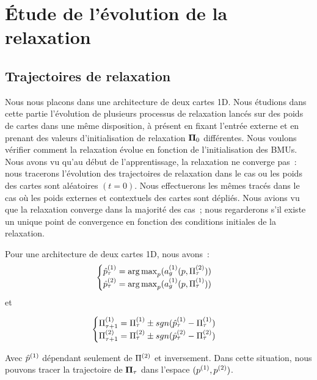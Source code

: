 \documentclass[../main]{subfiles}
\begin{document}
\section{\'Etude de l'évolution de la relaxation}

\subsection{Trajectoires de relaxation\label{sec:pf}}

Nous nous placons dans une architecture de deux cartes 1D.
Nous étudions dans cette partie l'évolution de plusieurs processus de relaxation lancés sur des poids de cartes dans une même disposition, à présent en fixant l'entrée externe et en prenant des valeurs d'initialisation de relaxation $\mathbf{\Pi}_0$ différentes.
Nous voulons vérifier comment la relaxation évolue en fonction de l'initialisation des BMUs.
Nous avons vu qu'au début de l'apprentissage, la relaxation ne converge pas~: nous tracerons l'évolution des trajectoires de relaxation dans le cas ou les poids des cartes sont aléatoires $(t=0)$.
Nous effectuerons les mêmes tracés dans le cas où les poids externes et contextuels des cartes sont dépliés. Nous avions vu que la relaxation converge dans la majorité des cas~; nous regarderons s'il existe un unique point de convergence en fonction des conditions initiales de la relaxation.


Pour une architecture de deux cartes 1D, nous avons~:
\begin{equation*}
	\begin{cases}
	\hat{p}^{({1})}_\tau = \operatorname*{arg\,max}_p(a_g^{({1})}(p, \Pi^{({2})}_\tau))\\
	\hat{p}^{({2})}_\tau = \operatorname*{arg\,max}_p(a_g^{({1})}(p, \Pi^{({1})}_\tau)) \\
	\end{cases}
	\end{equation*}
et 

\begin{equation*}
	\begin{cases}
	\Pi^{({1})}_{\tau+1} = \Pi^{({1})}_\tau \pm sgn(\hat{p}^{({1})}_\tau - \Pi^{({1})}_\tau)  \\
	\Pi^{({2})}_{\tau+1} = \Pi^{({2})}_\tau \pm sgn(\hat{p}^{({2})}_\tau - \Pi^{({2})}_\tau) \\
	\end{cases}
	\end{equation*}

Avec $\hat{p}^{({1})}$ dépendant seulement de $\Pi^{({2})}$ et inversement. 
Dans cette situation, nous pouvons tracer la trajectoire de $\mathbf{\Pi}_\tau$ dans l'espace $(p^{({1})}, p^{({2})})$.
\end{document}
